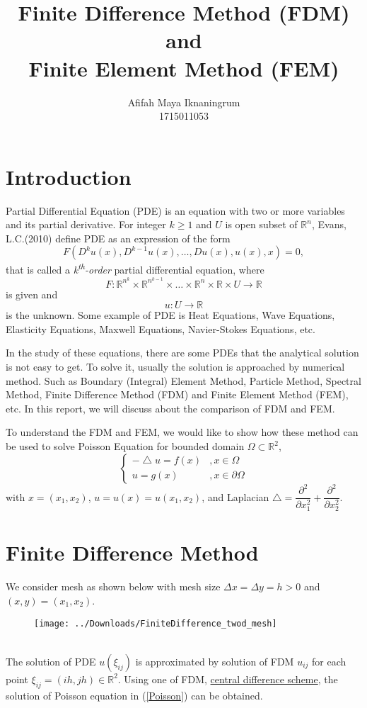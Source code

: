 \documentclass[]{article}
\title{Finite Difference Method (FDM) and \\Finite Element Method (FEM)}
\author{Afifah Maya Iknaningrum \\ 1715011053}
\newcommand{\R}{\mathbb{R}}
\begin{document}
\maketitle

\section{Introduction}
Partial Differential Equation (PDE) is an equation with two or more variables and its partial derivative. For integer $ k \geq 1 $ and $ U $ is open subset of $ \R^n $, Evans, L.C.(2010) define PDE as an expression of the form
\[ F(D^k u(x), D^{k-1} u(x), \dots , Du(x), u(x), x)=0, \]
that is called a \textit{k\textsuperscript{th}-order} partial differential equation, where
\[ F : \R^{n^{k}} \times \R^{n^{k-1}} \times \dots \times \R^{n} \times \R \times U \rightarrow \R \]
is given and
\[ u : U \rightarrow \R \]
is the unknown. Some example of PDE is Heat Equations, Wave Equations, Elasticity Equations, Maxwell Equations, Navier-Stokes Equations, etc.

In the study of these equations, there are some PDEs that the analytical solution is not easy to get. To solve it, usually the solution is approached by numerical method. Such as Boundary (Integral) Element Method, Particle Method, Spectral Method, Finite Difference Method (FDM) and Finite Element Method (FEM), etc. In this report, we will discuss about the comparison of FDM and FEM.

To understand the FDM and FEM, we would like to show how these method can be used to solve Poisson Equation for bounded domain $ \Omega \subset \R^2 $,
\begin{equation} \label{Poisson}
\begin{cases}
- \bigtriangleup u = f(x) &, x\in\Omega\\
u = g(x) &, x \in \partial \Omega
\end{cases}
\end{equation}
with $ x=(x_{1},x_{2}) $, $ u=u(x)=u(x_{1},x_{2}) $, and Laplacian $ \bigtriangleup = \dfrac{\partial^2}{\partial x_{1}^2} + \dfrac{\partial^2}{\partial x_{2}^2} $.

\section{Finite Difference Method}
We consider mesh as shown below with mesh size $ \Delta x  = \Delta y = h>0 $ and $ (x,y) = (x_{1},x_{2}) $.\\
\begin{figure}[h!]
	\centering
	\texttt{[image: ../Downloads/FiniteDifference\_twod\_mesh]}
	\caption{}
	\label{fig:finitedifferencetwodmesh}
\end{figure}
\\The solution of PDE $ u(\xi_{ij}) $ is approximated by solution of FDM $ u_{ij} $ for each point $ \xi_{ij} = (ih,jh) \in \R^2 $. Using one of FDM, \underline{central difference scheme}, the solution of Poisson equation in (\ref{Poisson}) can be obtained. 
\end{document}

